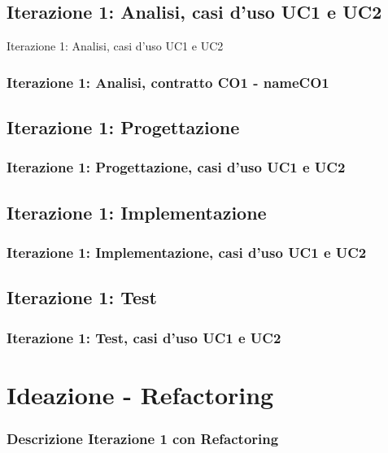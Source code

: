 \documentclass[t]{beamer} %
\begin{document}
\subsection{Iterazione 1: Analisi, casi d'uso UC1 e UC2}
\begin{frame} {Iterazione 1: Analisi, casi d'uso UC1 e UC2}
\end{frame}

\begin{frame}
 \frametitle{Iterazione 1: Analisi, contratto CO1 - nameCO1}
  \begin{table}[!htbp]
   \caption {Contratto CO1 - nameCO1}
    \label{table:1}
   \end{table}
\end{frame}

\subsection{Iterazione 1: Progettazione}
\begin{frame}
 \frametitle{Iterazione 1: Progettazione, casi d'uso UC1 e UC2}
\end{frame}

\subsection{Iterazione 1: Implementazione}
\begin{frame}
 \frametitle{Iterazione 1: Implementazione, casi d'uso UC1 e UC2}
\end{frame}

\subsection{Iterazione 1: Test}
\begin{frame}
 \frametitle{Iterazione 1: Test, casi d'uso UC1 e UC2}
\end{frame}

\section{Ideazione - Refactoring}
\begin{frame}
  \frametitle{Descrizione Iterazione 1 con Refactoring}
\end{frame}
\end{document}
